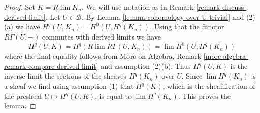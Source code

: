\documentclass[10pt,a4paper]{amsart}
\theoremstyle{plain}
\theoremstyle{definition}
\theoremstyle{remark}
\numberwithin{equation}{subsection}
\def\lim{\mathop{\mathrm{lim}}\nolimits}
\begin{document}
\begin{proof}
Set $K = R\lim K_n$. We will use notation as in
Remark \ref{remark-discuss-derived-limit}. Let $U \in \mathcal{B}$.
By Lemma \ref{lemma-cohomology-over-U-trivial} and (2)(a)
we have $H^q(U, K_n) = H^0(U, H^q(K_n))$.
Using that the functor $R\Gamma(U, -)$ commutes with
derived limits we have
$$
H^q(U, K) = H^q(R\lim R\Gamma(U, K_n)) = \lim H^0(U, H^q(K_n))
$$
where the final equality follows from
More on Algebra, Remark \ref{more-algebra-remark-compare-derived-limit}
and assumption (2)(b). Thus $H^q(U, K)$ is the inverse limit
the sections of the sheaves $H^q(K_n)$ over $U$. Since
$\lim H^q(K_n)$ is a sheaf we find using assumption (1) that $H^q(K)$,
which is the sheafification of the presheaf $U \mapsto H^q(U, K)$,
is equal to $\lim H^q(K_n)$. This proves the lemma.
\end{proof}
\end{document}
